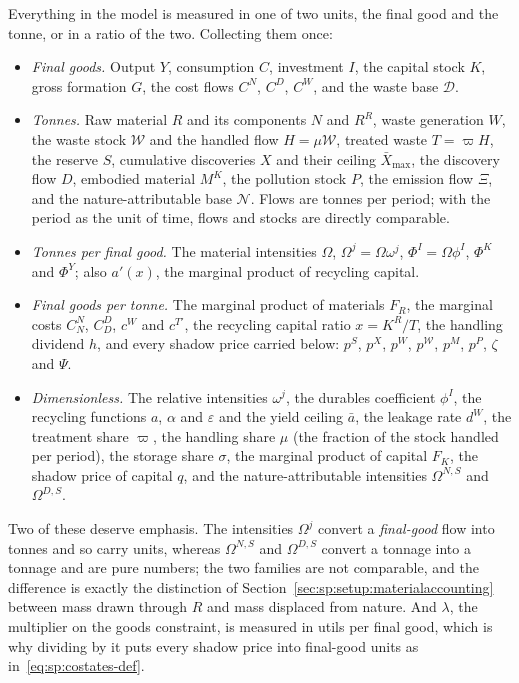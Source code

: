 Everything in the model is measured in one of two units, the final good and the tonne, or in a ratio of the two. Collecting them once:
\begin{itemize}
\item \emph{Final goods.} Output $Y$, consumption $C$, investment $I$, the capital stock $K$, gross formation $G$, the cost flows $C^N$, $C^D$, $C^W$, and the waste base $\mathcal D$.
\item \emph{Tonnes.} Raw material $R$ and its components $N$ and $R^R$, waste generation $W$, the waste stock $\mathcal W$ and the handled flow $H=\mu\mathcal W$, treated waste $T=\varpi H$, the reserve $S$, cumulative discoveries $X$ and their ceiling $\bar X_{\max}$, the discovery flow $D$, embodied material $M^K$, the pollution stock $P$, the emission flow $\Xi$, and the nature-attributable base $\mathcal N$. Flows are tonnes per period; with the period as the unit of time, flows and stocks are directly comparable.
\item \emph{Tonnes per final good.} The material intensities $\Omega$, $\Omega^j=\Omega\omega^j$, $\Phi^I=\Omega\phi^I$, $\Phi^K$ and $\Phi^Y$; also $a'\left(x\right)$, the marginal product of recycling capital.
\item \emph{Final goods per tonne.} The marginal product of materials $F_R$, the marginal costs $C^N_N$, $C^D_D$, $c^W$ and $c^{T\prime}$, the recycling capital ratio $x=K^R/T$, the handling dividend $h$, and every shadow price carried below: $p^S$, $p^X$, $p^W$, $p^{\mathcal W}$, $p^M$, $p^P$, $\zeta$ and $\Psi$.
\item \emph{Dimensionless.} The relative intensities $\omega^j$, the durables coefficient $\phi^I$, the recycling functions $a$, $\alpha$ and $\varepsilon$ and the yield ceiling $\bar a$, the leakage rate $d^W$, the treatment share $\varpi$, the handling share $\mu$ (the fraction of the stock handled per period), the storage share $\sigma$, the marginal product of capital $F_K$, the shadow price of capital $q$, and the nature-attributable intensities $\Omega^{N,S}$ and $\Omega^{D,S}$.
\end{itemize}
Two of these deserve emphasis. The intensities $\Omega^j$ convert a \emph{final-good} flow into tonnes and so carry units, whereas $\Omega^{N,S}$ and $\Omega^{D,S}$ convert a tonnage into a tonnage and are pure numbers; the two families are not comparable, and the difference is exactly the distinction of Section~\ref{sec:sp:setup:materialaccounting} between mass drawn through $R$ and mass displaced from nature. And $\lambda$, the multiplier on the goods constraint, is measured in utils per final good, which is why dividing by it puts every shadow price into final-good units as in~\eqref{eq:sp:costates-def}.

